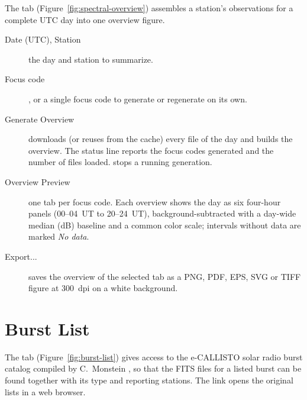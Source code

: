 The  tab (Figure~\ref{fig:spectral-overview}) assembles a station's
observations for a complete UTC day into one overview figure.


\begin{description}
  \item[Date (UTC), Station] the day and station to summarize.
  \item[Focus code] , or a single focus code to generate or
    regenerate on its own.
  \item[Generate Overview] downloads (or reuses from the cache) every file of the day and
    builds the overview. The status line reports the focus codes generated and the number of
    files loaded.  stops a running generation.
  \item[Overview Preview] one tab per focus code. Each overview shows the day as six
    four-hour panels (00--04~UT to 20--24~UT), background-subtracted with a day-wide median
    (dB) baseline and a common color scale; intervals without data are marked
    \emph{No data}.
  \item[Export...] saves the overview of the selected tab as a PNG, PDF, EPS, SVG or TIFF
    figure at 300~dpi on a white background.
\end{description}

\section{Burst List}
\label{sec:burst-list}

The  tab (Figure~\ref{fig:burst-list}) gives access to the e-CALLISTO solar
radio burst catalog compiled by C.~Monstein \parencite{monsteinlist}, so that the FITS files
for a listed burst can be found together with its type and reporting stations. The
 link opens the original lists in a web browser.


